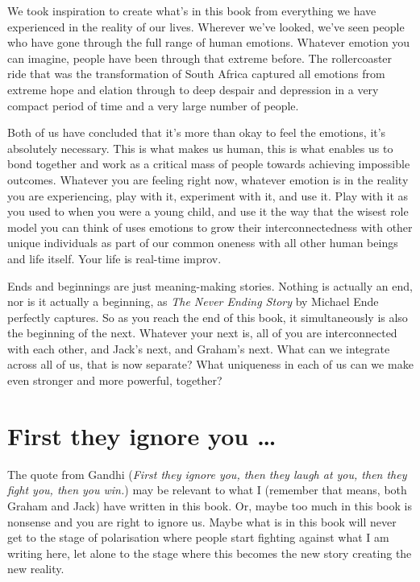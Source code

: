 We took inspiration to create what's in this book from everything we have experienced in the reality of our lives. Wherever we've looked, we've seen people who have gone through the full range of human emotions. Whatever emotion you can imagine, people have been through that extreme before. The rollercoaster ride that was the transformation of South Africa captured all emotions from extreme hope and elation through to deep despair and depression in a very compact period of time and a very large number of people. 


Both of us have concluded that it's more than okay to feel the emotions, it's absolutely necessary. This is what makes us human, this is what enables us to bond together and work as a critical mass of people towards achieving impossible outcomes. Whatever you are feeling right now, whatever emotion is in the reality you are experiencing, play with it, experiment with it, and use it. Play with it as you used to when you were a young child, and use it the way that the wisest role model you can think of uses emotions to grow their interconnectedness with other unique individuals as part of our common oneness with all other human beings and life itself. Your life is real-time improv.


Ends and beginnings are just meaning-making stories. Nothing is actually an end, nor is it actually a beginning, as  \emph{The Never Ending Story}\cite{ende-never} by Michael Ende perfectly captures. So as you reach the end of this book, it simultaneously is also the beginning of the next. Whatever your next is, all of you are interconnected with each other, and Jack's next, and Graham's next. What can we integrate across all of us, that is now separate? What uniqueness in each of us can we make even stronger and more powerful, together?






\section{First they ignore you \ldots}
The quote from Gandhi (\emph{First they ignore you, then they laugh at you, then they fight you, then you win.}) may be relevant to what I (remember that means, both Graham and Jack) have written in this book. Or, maybe too much in this book is nonsense and you are right to ignore us. Maybe what is in this book will never get to the stage of polarisation where people start fighting against what I am writing here, let alone to the stage where this becomes the new story creating the new reality.


